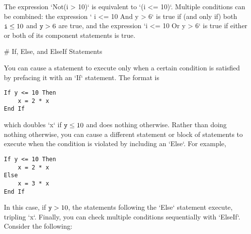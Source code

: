 The expression `Not(i > 10)` is equivalent to `(i <= 10)`. Multiple
conditions can be combined: the expression ` i <= 10 And  y > 6` is true
if (and only if) both $\verb!i!\leq 10$ and $\verb!y!>6$ are true, and
the expression `i <= 10 Or y > 6` is true if either or both of its
component statements is true.

# If, Else, and ElseIf Statements


You can cause a statement to execute only when a certain condition is
satisfied by prefacing it with an `If` statement. The format is

\small\begin{verbatim}
If y <= 10 Then
    x = 2 * x
End If
\end{verbatim}\normalsize
which doubles `x` if $\verb!y!\leq 10$ and does nothing otherwise.
Rather than doing nothing otherwise, you can cause a different statement
or block of statements to execute when the condition is violated by
including an `Else`. For example,

\small\begin{verbatim}
If y <= 10 Then
    x = 2 * x
Else
    x = 3 * x
End If
\end{verbatim}\normalsize
In this case, if $\verb!y! > 10$, the statements following the `Else`
statement execute, tripling `x`. Finally, you can check multiple
conditions sequentially with `ElseIf`. Consider the following:

